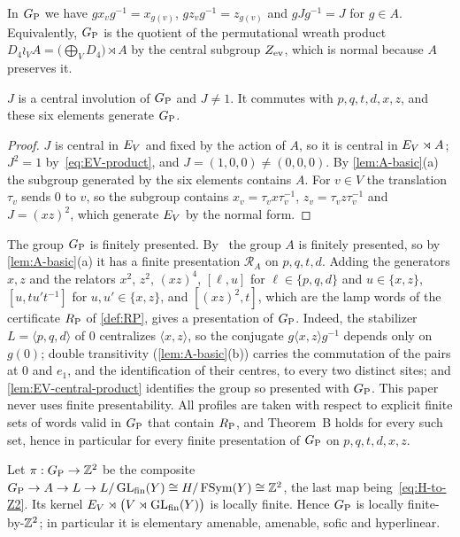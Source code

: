 In $G_{\mathrm P}$ we have $gx_vg^{-1}=x_{g(v)}$, $gz_vg^{-1}=z_{g(v)}$ and $gJg^{-1}=J$ for $g\in A$. Equivalently, $G_{\mathrm P}$ is the quotient of the
permutational wreath product $D_4\wr_VA=\bigl(\bigoplus_VD_4\bigr)\rtimes A$ by the central subgroup $Z_{\rm ev}$, which is normal
because $A$ preserves it.

\begin{proposition}\label{prop:J-central}
$J$ is a central involution of $G_{\mathrm P}$ and $J\ne1$. It commutes with $p,q,t,d,x,z$, and these six elements generate $G_{\mathrm P}$.
\end{proposition}

\begin{proof}
$J$ is central in $E_V$ and fixed by the action of $A$, so it is central in $E_V\rtimes A$; $J^2=1$ by~\eqref{eq:EV-product}, and
$J=(1,0,0)\ne(0,0,0)$. By \cref{lem:A-basic}(a) the subgroup generated by the six elements contains $A$. For $v\in V$ the translation
$\tau_v$ sends $0$ to $v$, so the subgroup contains $x_v=\tau_vx\tau_v^{-1}$, $z_v=\tau_vz\tau_v^{-1}$ and $J=(xz)^2$, which generate $E_V$
by the normal form.
\end{proof}

\begin{remark}\label{rem:GP-fp}
The group $G_{\mathrm P}$ is finitely presented. By~\cite[Proposition~7.1]{DM-lamps} the group $A$ is finitely presented, so by
\cref{lem:A-basic}(a) it has a finite presentation $\mathcal R_A$ on $p,q,t,d$. Adding the generators $x,z$ and the relators $x^2$, $z^2$,
$(xz)^4$, $[\ell,u]$ for $\ell\in\{p,q,d\}$ and $u\in\{x,z\}$, $[u,tu't^{-1}]$ for $u,u'\in\{x,z\}$, and $[(xz)^2,t]$, which are the
lamp words of the certificate $R_{\mathrm P}$ of \cref{def:RP}, gives a presentation of $G_{\mathrm P}$. Indeed, the stabilizer $L=\langle p,q,d\rangle$ of $0$
centralizes $\langle x,z\rangle$, so the conjugate $g\langle x,z\rangle g^{-1}$ depends only on $g(0)$; double transitivity
(\cref{lem:A-basic}(b)) carries the commutation of the pairs at $0$ and $e_1$, and the identification of their centres, to every two
distinct sites; and \cref{lem:EV-central-product} identifies the group so presented with $G_{\mathrm P}$. This paper never uses finite
presentability. All profiles are taken with respect to explicit finite sets of words valid in $G_{\mathrm P}$ that contain $R_{\mathrm P}$, and Theorem~B holds
for every such set, hence in particular for every finite presentation of $G_{\mathrm P}$ on $p,q,t,d,x,z$.
\end{remark}

\begin{proposition}[Amenability]\label{prop:GP-amenable}
Let $\pi:G_{\mathrm P}\to\mathbb Z^2$ be the composite $G_{\mathrm P}\to A\to L\to L/\operatorname{GL}_{\rm fin}(Y)\cong H/\operatorname{FSym}(Y)\cong\mathbb Z^2$, the last map being~\eqref{eq:H-to-Z2}.
Its kernel $E_V\rtimes\bigl(V\rtimes\operatorname{GL}_{\rm fin}(Y)\bigr)$ is locally finite. Hence $G_{\mathrm P}$ is locally finite-by-$\mathbb Z^2$; in particular it is
elementary amenable, amenable, sofic and hyperlinear.
\end{proposition}

